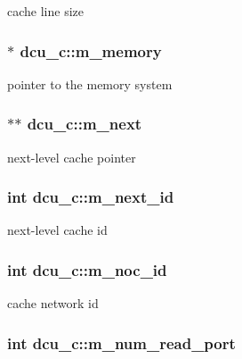 \label{classdcu__c_a54a23275701e0abe535da85c54252ac8}
cache line size \hypertarget{classdcu__c_a6025ab87f89f05ce3d092aabd941aec6}{
\subsubsection[{m\_\-memory}]{$\ast$ {\bf dcu\_\-c::m\_\-memory}}}
\label{classdcu__c_a6025ab87f89f05ce3d092aabd941aec6}
pointer to the memory system \hypertarget{classdcu__c_a00edf5a77fc43d86790e0a04e7866833}{
\subsubsection[{m\_\-next}]{$\ast$$\ast$ {\bf dcu\_\-c::m\_\-next}}}
\label{classdcu__c_a00edf5a77fc43d86790e0a04e7866833}
next-\/level cache pointer \hypertarget{classdcu__c_aaf2ea302ee6c02d0202c0073d12d1813}{
\subsubsection[{m\_\-next\_\-id}]{\setlength{\rightskip}{0pt plus 5cm}int {\bf dcu\_\-c::m\_\-next\_\-id}}}
\label{classdcu__c_aaf2ea302ee6c02d0202c0073d12d1813}
next-\/level cache id \hypertarget{classdcu__c_a3ab8a45d54041c88b9556d2edf07b377}{
\subsubsection[{m\_\-noc\_\-id}]{\setlength{\rightskip}{0pt plus 5cm}int {\bf dcu\_\-c::m\_\-noc\_\-id}}}
\label{classdcu__c_a3ab8a45d54041c88b9556d2edf07b377}
cache network id \hypertarget{classdcu__c_aa5804689736f9d3db9e5d9a7a88a8b62}{
\subsubsection[{m\_\-num\_\-read\_\-port}]{\setlength{\rightskip}{0pt plus 5cm}int {\bf dcu\_\-c::m\_\-num\_\-read\_\-port}}}
